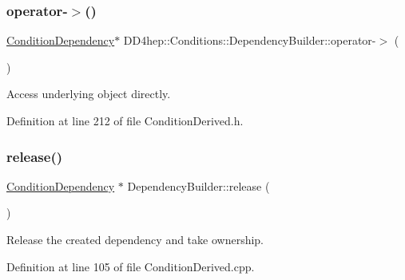 \hypertarget{class_d_d4hep_1_1_conditions_1_1_dependency_builder_a250f7140327ba7e4e7344b47313ad0b5}{}\label{class_d_d4hep_1_1_conditions_1_1_dependency_builder_a250f7140327ba7e4e7344b47313ad0b5} 
\subsubsection{\texorpdfstring{operator-\/$>$()}{operator->()}}
{\footnotesize\ttfamily \hyperlink{class_d_d4hep_1_1_conditions_1_1_condition_dependency}{Condition\+Dependency}$\ast$ D\+D4hep\+::\+Conditions\+::\+Dependency\+Builder\+::operator-\/$>$ (\begin{DoxyParamCaption}{ }\end{DoxyParamCaption})\hspace{0.3cm}{\ttfamily [inline]}}



Access underlying object directly. 



Definition at line 212 of file Condition\+Derived.\+h.

\hypertarget{class_d_d4hep_1_1_conditions_1_1_dependency_builder_a184c80416875c91985dda61b26a04022}{}\label{class_d_d4hep_1_1_conditions_1_1_dependency_builder_a184c80416875c91985dda61b26a04022} 
\subsubsection{\texorpdfstring{release()}{release()}}
{\footnotesize\ttfamily \hyperlink{class_d_d4hep_1_1_conditions_1_1_condition_dependency}{Condition\+Dependency} $\ast$ Dependency\+Builder\+::release (\begin{DoxyParamCaption}{ }\end{DoxyParamCaption})}



Release the created dependency and take ownership. 



Definition at line 105 of file Condition\+Derived.\+cpp.



